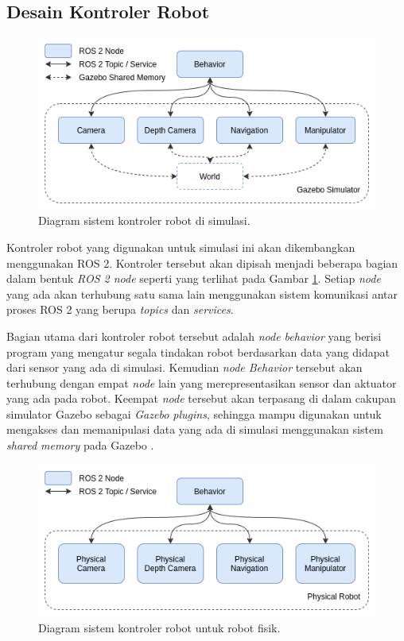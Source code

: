 \subsection{Desain Kontroler Robot}
\label{subsec:desainkontroler}

\begin{figure} [ht]
  \centering
  \includegraphics[scale=0.45]{gambar/kontrolersimulasi.png}
  \caption{Diagram sistem kontroler robot di simulasi.}
  \label{fig:kontrolersimulasi}
\end{figure}

Kontroler robot yang digunakan untuk simulasi ini akan dikembangkan menggunakan ROS 2.
Kontroler tersebut akan dipisah menjadi beberapa bagian dalam bentuk \emph{ROS 2 node} seperti yang terlihat pada Gambar \ref{fig:kontrolersimulasi}.
Setiap \emph{node} yang ada akan terhubung satu sama lain menggunakan sistem komunikasi antar proses ROS 2 yang berupa \emph{topics} dan \emph{services}.

Bagian utama dari kontroler robot tersebut adalah \emph{node behavior} yang berisi program yang mengatur segala tindakan robot berdasarkan data yang didapat dari sensor yang ada di simulasi.
Kemudian \emph{node Behavior} tersebut akan terhubung dengan empat \emph{node} lain yang merepresentasikan sensor dan aktuator yang ada pada robot.
Keempat \emph{node} tersebut akan terpasang di dalam cakupan simulator Gazebo sebagai \emph{Gazebo plugins}, sehingga mampu digunakan untuk mengakses dan memanipulasi data yang ada di simulasi menggunakan sistem \emph{shared memory} pada Gazebo \citep{gazeboplugins}.

\begin{figure} [ht] \centering
  \includegraphics[scale=0.45]{gambar/kontrolerfisik.png}
  \caption{Diagram sistem kontroler robot untuk robot fisik.}
  \label{fig:kontrolerfisik}
\end{figure}

